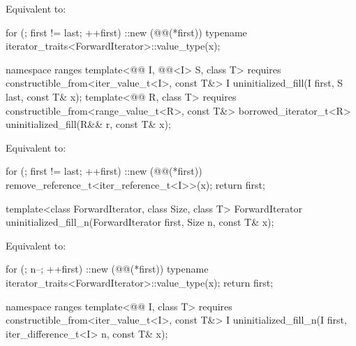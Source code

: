 \begin{itemdescr}
\pnum
\effects
Equivalent to:
\begin{codeblock}
for (; first != last; ++first)
  ::new (@@(*first))
    typename iterator_traits<ForwardIterator>::value_type(x);
\end{codeblock}
\end{itemdescr}

%
\begin{itemdecl}
namespace ranges {
  template<@@ I, @@<I> S, class T>
      requires constructible_from<iter_value_t<I>, const T&>
    I uninitialized_fill(I first, S last, const T& x);
  template<@@ R, class T>
      requires constructible_from<range_value_t<R>, const T&>
    borrowed_iterator_t<R> uninitialized_fill(R&& r, const T& x);
}
\end{itemdecl}

\begin{itemdescr}
\effects
Equivalent to:
\begin{codeblock}
for (; first != last; ++first) {
  ::new (@@(*first)) remove_reference_t<iter_reference_t<I>>(x);
}
return first;
\end{codeblock}
\end{itemdescr}

%
\begin{itemdecl}
template<class ForwardIterator, class Size, class T>
  ForwardIterator uninitialized_fill_n(ForwardIterator first, Size n, const T& x);
\end{itemdecl}

\begin{itemdescr}
\pnum
\effects
Equivalent to:
\begin{codeblock}
for (; n--; ++first)
  ::new (@@(*first))
    typename iterator_traits<ForwardIterator>::value_type(x);
return first;
\end{codeblock}
\end{itemdescr}

%
\begin{itemdecl}
namespace ranges {
  template<@@ I, class T>
      requires constructible_from<iter_value_t<I>, const T&>
    I uninitialized_fill_n(I first, iter_difference_t<I> n, const T& x);
}
\end{itemdecl}


